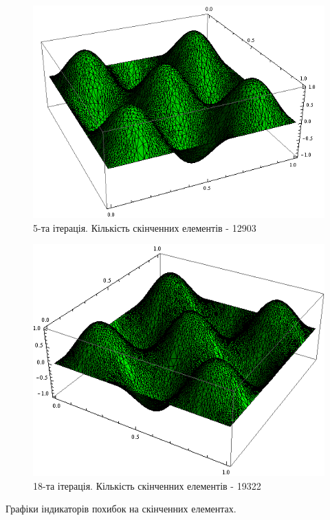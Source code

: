\begin{figure}[H]
	\centering
    \includegraphics[scale=0.7]{problem1/my/solutions/5}
    \caption{5-та ітерація. Кількість скінченних елементів - 12903}
    \label{fig:p1_solution5}
\end{figure}

\begin{figure}[H]
	\centering
    \includegraphics[scale=0.7]{problem1/my/solutions/18}
    \caption{18-та ітерація. Кількість скінченних елементів - 19322}
    \label{fig:p1_solution18}
\end{figure}

Графіки індикаторів похибок на скінченних елементах.

